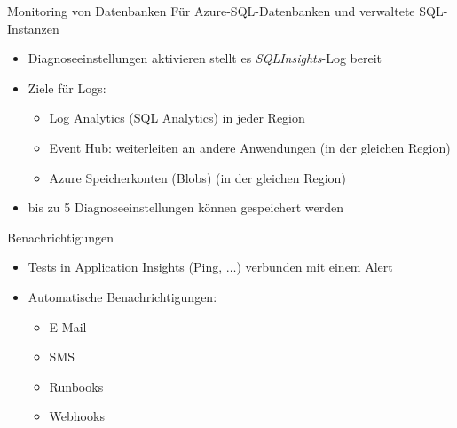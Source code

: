 \begin{flashcard}[]{Monitoring von Datenbanken}
  Für Azure-SQL-Datenbanken und verwaltete SQL-Instanzen
  \begin{itemize}
    \item Diagnoseeinstellungen aktivieren stellt es \emph{SQLInsights}-Log bereit
    \item Ziele für Logs:
      \begin{itemize}
        \item Log Analytics (SQL Analytics) in jeder Region
        \item Event Hub: weiterleiten an andere Anwendungen (in der gleichen Region)
        \item Azure Speicherkonten (Blobs) (in der gleichen Region)
      \end{itemize}
    \item bis zu 5 Diagnoseeinstellungen können gespeichert werden
  \end{itemize}
\end{flashcard}


\begin{flashcard}[Definition]{Benachrichtigungen}
  \begin{itemize}
    \item Tests in Application Insights (Ping, $\ldots$) verbunden mit einem Alert
    \item Automatische Benachrichtigungen:
    \begin{itemize}
      \item E-Mail
      \item SMS
      \item Runbooks
      \item Webhooks
    \end{itemize}

  \end{itemize}
\end{flashcard}


